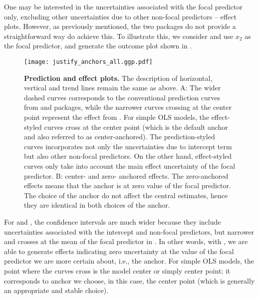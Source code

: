 One may be interested in the uncertainties associated with the focal predictor only, excluding other uncertainties due to other non-focal predictors -- effect plots. However, as previously mentioned, the two packages do not provide a straightforward way do achieve this. To illustrate this, we consider  and use $x_2$ as the focal predictor, and generate the outcome plot shown in . 
%
\begin{figure}
\begin{center}
\texttt{[image: justify\_anchors\_all.ggp.pdf]}
\end{center}
\caption{{\bf Prediction and effect plots.} The description of horizontal, vertical and trend lines remain the same as above. A: The wider dashed curves corresponds to the conventional prediction curves from  and  packages, while the narrower curves crossing at the center point represent the effect from . For simple OLS models, the effect-styled curves cross at the center point (which is the default anchor and also referred to as center-anchored). The prediction-styled curves incorporates not only the uncertainties due to intercept term but also other non-focal predictors. On the other hand, effect-styled curves only take into account the main effect uncertainty of the focal predictor. B: center- and zero- anchored effects. The zero-anchored effects means that the anchor is at zero value of the focal predictor. The choice of the anchor do not affect the central estimates, hence they are identical in both choices of the anchor.}
\label{fig:justify_ci_plots}
\end{figure}
%
For  and , the confidence intervals are much wider because they include uncertainties associated with the intercept and non-focal predictors, but narrower and crosses at the mean of the focal predictor in . In other words, with , we are able to generate effects indicating zero uncertainty at the value of the focal predictor we are more certain about, i.e., the anchor. For simple OLS models, the point where the curves cross is the model center or simply center point; it corresponds to anchor we choose, in this case, the center point (which is generally an appropriate and stable choice). 

